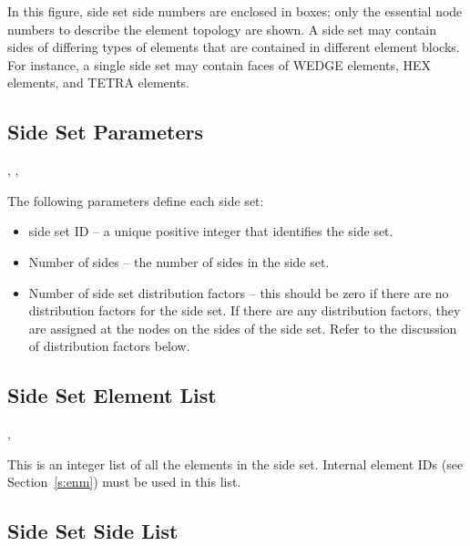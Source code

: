  In this figure, side set side numbers are enclosed in boxes; only the
 essential node numbers to describe the element topology are shown. A
 side set may contain sides of differing types of elements that are
 contained in different element blocks. For instance, a single side
 set may contain faces of WEDGE elements, HEX elements, and TETRA
 elements.



\subsection{Side Set Parameters}



\begin{spacing}{1.5}
\api {}, , 
\end{spacing}

{The following parameters define each side set:}

\begin{itemize}
 \item {side set ID -- a unique positive integer that identifies the
 side set.}

 \item {Number of sides -- the number of sides in the side
set.}

 \item {Number of side set distribution factors -- this should be zero
 if there are no distribution factors for the side set. If there are
 any distribution factors, they are assigned at the nodes on the sides
 of the side set. Refer to the discussion of distribution factors
 below.}
\end{itemize}

\subsection{Side Set Element List}



\begin{spacing}{1.5}
\api {}, 
\end{spacing}

{This is an integer list of all the elements in the side set.
Internal element IDs (see  Section~\ref{s:enm}) must be used
in this list.}



\subsection{Side Set Side List}



